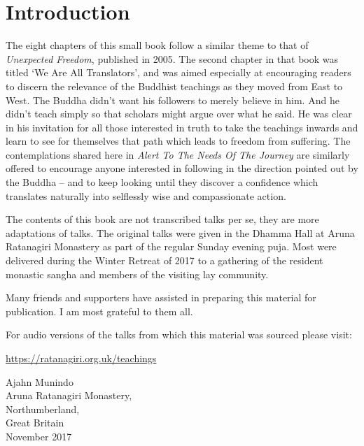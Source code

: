 
\chapter{Introduction}

The eight chapters of this small book follow a similar theme to that of
\emph{Unexpected Freedom}, published in 2005. The second chapter in that book
was titled ‘We Are All Translators’, and was aimed especially at
encouraging readers to discern the relevance of the Buddhist teachings
as they moved from East to West. The Buddha didn’t want his followers to
merely believe in him. And he didn’t teach simply so that scholars might
argue over what he said. He was clear in his invitation for all those
interested in truth to take the teachings inwards and learn to see for
themselves that path which leads to freedom from suffering. The
contemplations shared here in \emph{Alert To The Needs Of The Journey} are
similarly offered to encourage anyone interested in following in the
direction pointed out by the Buddha – and to keep looking until they
discover a confidence which translates naturally into selflessly wise
and compassionate action.

The contents of this book are not transcribed talks per se, they are
more adaptations of talks. The original talks were given in the Dhamma
Hall at Aruna Ratanagiri Monastery as part of the regular Sunday evening
puja. Most were delivered during the Winter Retreat of 2017 to a
gathering of the resident monastic sangha and members of the visiting
lay community.

Many friends and supporters have assisted in preparing this material for
publication. I am most grateful to them all.

For audio versions of the talks from which this material was sourced please
visit:

\href{https://ratanagiri.org.uk/teachings}{https://ratanagiri.org.uk/teachings}

{\raggedleft
Ajahn Munindo \\
Aruna Ratanagiri Monastery, \\
Northumberland, \\
Great Britain \\
November 2017
\par}

